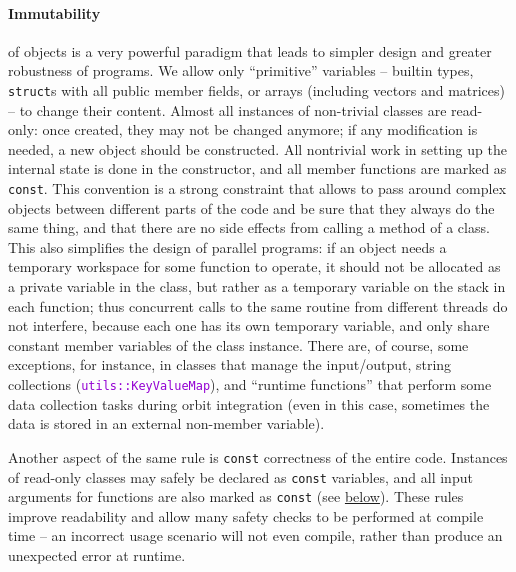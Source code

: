 \documentclass[12pt]{article}
\newcommand{\ttt}[1]{\textcolor{darkviolet}{\texttt{#1}}}
\begin{document}
\paragraph{Immutability} \label{sec:Const}  of objects is a very powerful paradigm that leads to simpler design and greater robustness of programs. We allow only ``primitive'' variables -- builtin types, \texttt{struct}s with all public member fields, or arrays (including vectors and matrices) -- to change their content. Almost all instances of non-trivial classes are read-only: once created, they may not be changed anymore; if any modification is needed, a new object should be constructed. All nontrivial work in setting up the internal state is done in the constructor, and all member functions are marked as \texttt{const}. This convention is a strong constraint that allows to pass around complex objects between different parts of the code and be sure that they always do the same thing, and that there are no side effects from calling a method of a class. This also simplifies the design of parallel programs: if an object needs a temporary workspace for some function to operate, it should not be allocated as a private variable in the class, but rather as a temporary variable on the stack in each function; thus concurrent calls to the same routine from different threads do not interfere, because each one has its own temporary variable, and only share constant member variables of the class instance.
There are, of course, some exceptions, for instance, in classes that manage the input/output, string collections (\ttt{utils::KeyValueMap}), and ``runtime functions'' that perform some data collection tasks during orbit integration (even in this case, sometimes the data is stored in an external non-member variable).

Another aspect of the same rule is \texttt{const} correctness of the entire code. Instances of read-only classes may safely be declared as \texttt{const} variables, and all input arguments for functions are also marked as \texttt{const} (see \hyperref[sec:CallingConventions]{below}).
These rules improve readability and allow many safety checks to be performed at compile time -- an incorrect usage scenario will not even compile, rather than produce an unexpected error at runtime.
\end{document}
